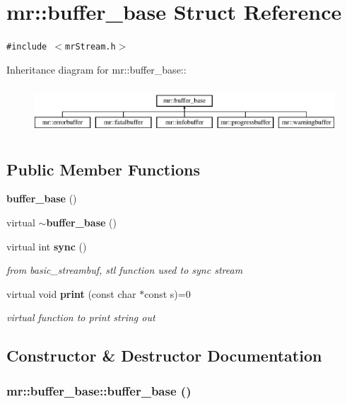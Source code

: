 \section{mr::buffer\_\-base Struct Reference}
\label{structmr_1_1buffer__base}
{\tt \#include $<$mr\-Stream.h$>$}

Inheritance diagram for mr::buffer\_\-base::\begin{figure}[H]
\begin{center}
\leavevmode
\includegraphics[height=1.80645cm]{structmr_1_1buffer__base}
\end{center}
\end{figure}
\subsection*{Public Member Functions}
\begin{CompactItemize}
\item 
{\bf buffer\_\-base} ()
\item 
virtual {\bf $\sim$buffer\_\-base} ()
\item 
virtual int {\bf sync} ()
\begin{CompactList}\small\item\em from basic\_\-streambuf, stl function used to sync stream \item\end{CompactList}\item 
virtual void {\bf print} (const char $\ast$const s)=0
\begin{CompactList}\small\item\em virtual function to print string out \item\end{CompactList}\end{CompactItemize}


\subsection{Constructor \& Destructor Documentation}
\subsubsection{\setlength{\rightskip}{0pt plus 5cm}mr::buffer\_\-base::buffer\_\-base ()\hspace{0.3cm}{\tt  [inline]}}\label{structmr_1_1buffer__base_a0}


